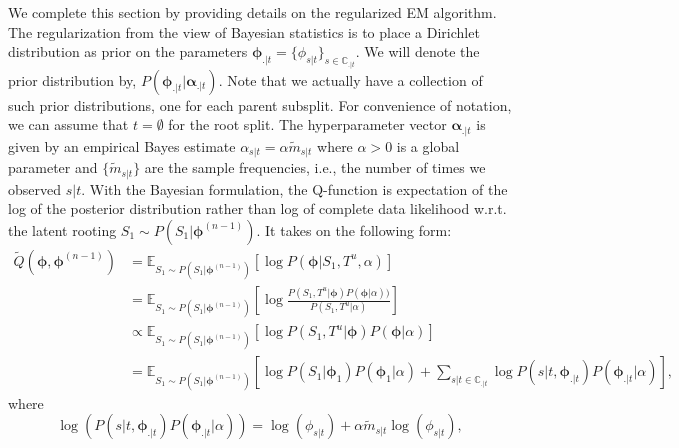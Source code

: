 \documentclass{article}
\newcommand{\E}{\mathbb{E}}
\begin{document}
We complete this section by providing details on the regularized EM algorithm.
The regularization from the view of Bayesian statistics is to place a Dirichlet distribution as prior on the parameters $\bm{\phi}_{.|t} = \{\phi_{s|t}\}_{s \in \mathbb{C}_{.|t}}$.
We will denote the prior distribution by, $P(\bm{\phi}_{.|t} | \bm{\alpha}_{.|t})$.
Note that we actually have a collection of such prior distributions, one for each parent subsplit.
For convenience of notation, we can assume that $t = \emptyset$ for the root split.
The hyperparameter vector $\bm{\alpha}_{.|t}$ is given by an empirical Bayes estimate $\alpha_{s|t} = \alpha \tilde{m}_{s|t}$ where $\alpha > 0$ is a global parameter and $\{\tilde{m}_{s|t}\}$ are the sample frequencies, i.e., the number of times we observed $s|t$.
With the Bayesian formulation, the Q-function is expectation of the log of the posterior distribution rather than log of complete data likelihood w.r.t. the latent rooting $S_1 \sim P(S_1 | \bm{\phi}^{(n-1)})$.
It takes on the following form:
\begin{align*}
    \tilde{Q}(\bm{\phi}, \bm{\phi}^{(n-1)}) &= \E_{S_1 \sim P(S_1 | \bm{\phi}^{(n-1)})}\left[ \log P(\bm{\phi} | S_1, T^u, \alpha) \right] \\
    &= \E_{S_1 \sim P(S_1 | \bm{\phi}^{(n-1)})}\left[ \log \frac{P(S_1, T^u | \bm{\phi}) P(\bm{\phi} | \alpha))}{P(S_1, T^u | \alpha)} \right] \\
    &\propto \E_{S_1 \sim P(S_1 | \bm{\phi}^{(n-1)})}\left[ \log P(S_1, T^u | \bm{\phi}) P(\bm{\phi} | \alpha) \right] \\
    &= \E_{S_1 \sim P(S_1 | \bm{\phi}^{(n-1)})}\left[ \log P(S_1 | \bm{\phi}_{1}) P(\bm{\phi}_1 | \alpha) + \sum\limits_{s|t \in \mathbb{C}_{.|t}} \log P(s | t, \bm{\phi}_{.|t}) P(\bm{\phi}_{.|t} | \alpha) \right],
\end{align*}
where
\begin{equation*}
    \log \left( P(s | t, \bm{\phi}_{.|t})P(\bm{\phi}_{.|t} | \alpha) \right) = \log(\phi_{s|t}) + \alpha \tilde{m}_{s|t} \log(\phi_{s|t}),
\end{equation*}
\end{document}

